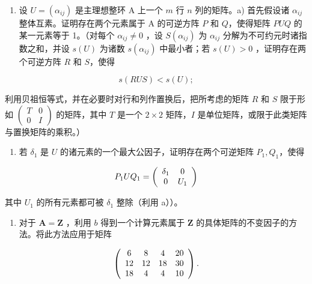 \BourbakiExerciseGroup

\begin{enumerate}
\def\labelenumi{\arabic{enumi})}
\tightlist
\item
  设 \(U = (\alpha_{ij})\) 是主理想整环 A 上一个 \(m\) 行 \(n\) 列的矩阵。a) 首先假设诸 \(\alpha_{ij}\) 整体互素。证明存在两个元素属于 A 的可逆方阵 \(P\) 和 \(Q\)，使得矩阵 \(PUQ\) 的某一元素等于 1。（对每个 \(\alpha_{ij} \neq 0\) ，设 \(S(\alpha_{ij})\) 为 \(\alpha_{ij}\) 分解为不可约元时诸指数之和，并设 \(s(U)\) 为诸数 \(s(\alpha_{ij})\) 中最小者；若 \(s(U) > 0\) ，证明存在两个可逆方阵 \(R\) 和 \(S\)，使得
\end{enumerate}

\[
s (R U S) <   s (U);
\]

利用贝祖恒等式，并在必要时对行和列作置换后，把所考虑的矩阵 \(R\) 和 \(S\) 限于形如 \(\begin{pmatrix} T & 0 \\ 0 & I \end{pmatrix}\) 的矩阵，其中 \(T\) 是一个 \(2 \times 2\) 矩阵，\(I\) 是单位矩阵，或限于此类矩阵与置换矩阵的乘积。）

\begin{enumerate}
\def\labelenumi{\alph{enumi})}
\setcounter{enumi}{1}
\tightlist
\item
  若 \(\delta_1\) 是 \(U\) 的诸元素的一个最大公因子，证明存在两个可逆矩阵 \(P_1, Q_1\)，使得
\end{enumerate}

\[
P _ {1} U Q _ {1} = \left( \begin{array}{c c} \delta_ {1} & 0 \\ 0 & U _ {1} \end{array} \right)
\]

其中 \(U_{1}\) 的所有元素都可被 \(\delta_{1}\) 整除（利用 a））。

\begin{enumerate}
\def\labelenumi{\alph{enumi})}
\setcounter{enumi}{2}
\tightlist
\item
  对于 \(\mathbf{A} = \mathbf{Z}\) ，利用 \(b\) 得到一个计算元素属于 \(\mathbf{Z}\) 的具体矩阵的不变因子的方法。将此方法应用于矩阵
\end{enumerate}

\[
\left( \begin{array}{c c c c} 6 & 8 & 4 & 20 \\ 12 & 12 & 18 & 30 \\ 18 & 4 & 4 & 10 \end{array} \right).
\]

